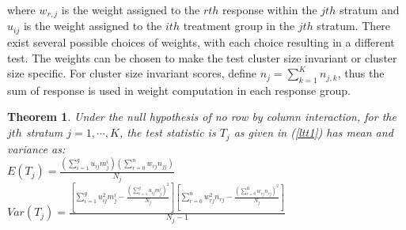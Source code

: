 \documentclass[12pt,oneside]{report}
\newtheorem{theorem}[fact]{Theorem}
\theoremstyle{definition}
\theoremstyle{mystyle}
\begin{document}
where $w_{r,j}$ is the weight assigned to the $rth$ response within the   $jth$  stratum and $u_{ij}$ is the weight assigned to the $ith$ treatment group in the $jth$ stratum. There exist  several possible choices of weights, with each  choice resulting  in a different test. The weights can be chosen to make the test cluster size invariant or cluster size specific. For cluster size invariant scores, define $n_{j}=\sum\limits_{k=1}^{K}n_{j,k}$, thus the sum of response is used in weight computation  in each response group.  
\begin{theorem}
	

Under the null hypothesis of no row by column interaction, for the    $jth$ stratum $j=1,\cdots,K$, the test statistic  is  $T_{j}$ as given in  (\ref{ltt1})  has mean and variance as:\\

$E(T_{j})=\displaystyle\frac{\left(\sum \limits_{i=1}^{g}u_{ij}m_{j}^{i}\right)\left(\sum\limits_{r=0}^{n}w_{rj}n_{jj}\right)}{N_{j}}$\\

$Var(T_{j})=\displaystyle\frac{\left[ \sum \limits_{i=1}^{g}u_{ij}^{2}m_{j}^{i}-\frac{\left(\sum\limits_{i=1}^{g}u_{ij}m_{j}^{i} \right)^{2}}{N_{j}} \right]\left[ \sum \limits_{r=0}^{n}w_{rj}^{2}n_{rj}-\frac{\left(\sum\limits_{r=0}^{K}w_{rj}n_{rj} \right)^{2}}{N_{j}} \right]}{ N_{j}-1}$\\
\end{theorem}
\end{document}
